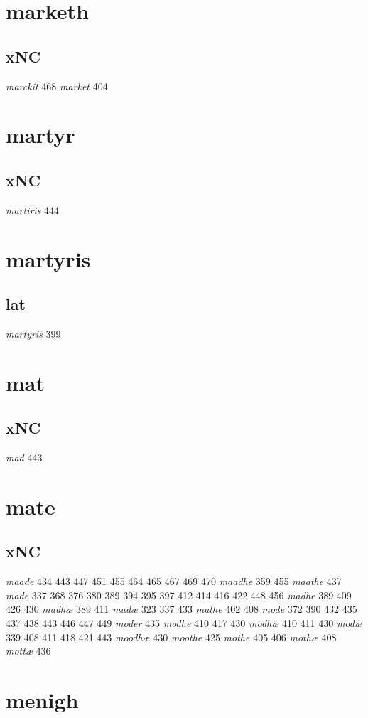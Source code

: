 \documentclass[a4paper,twocolumn]{article}
\begin{document}
\section{marketh}
\label{sec:orga7717f4}
\subsection{xNC}
\label{sec:org7d15454}
\emph{marckit} 468 \emph{market} 404 
\section{martyr}
\label{sec:org2b88f05}
\subsection{xNC}
\label{sec:org028d089}
\emph{martiris} 444 
\section{martyris}
\label{sec:orgc21e099}
\subsection{lat}
\label{sec:org1b03870}
\emph{martyris} 399 
\section{mat}
\label{sec:orgbecff65}
\subsection{xNC}
\label{sec:org3b40f75}
\emph{mad} 443 
\section{mate}
\label{sec:orgbb2f7fb}
\subsection{xNC}
\label{sec:orgdb40704}
\emph{maade} 434 443 447 451 455 464 465 467 469 470 \emph{maadhe} 359 455 \emph{maathe} 437 \emph{made} 337 368 376 380 389 394 395 397 412 414 416 422 448 456 \emph{madhe} 389 409 426 430 \emph{madhæ} 389 411 \emph{madæ} 323 337 433 \emph{mathe} 402 408 \emph{mode} 372 390 432 435 437 438 443 446 447 449 \emph{moder} 435 \emph{modhe} 410 417 430 \emph{modhæ} 410 411 430 \emph{modæ} 339 408 411 418 421 443 \emph{moodhæ} 430 \emph{moothe} 425 \emph{mothe} 405 406 \emph{mothæ} 408 \emph{mottæ} 436 
\section{menigh}
\label{sec:org7c96f89}
\end{document}
